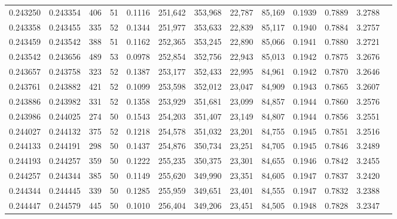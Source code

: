 \begin{tabular}{rrrrrrrrrrrrr}
0.243250 & 0.243354 &   406 &  51 &                                     0.1116 & 251,642 & 353,968 &  22,787 &  85,169 & 0.1939 & 0.7889 & 3.2788 \\
0.243358 & 0.243455 &   335 &  52 &                                     0.1344 & 251,977 & 353,633 &  22,839 &  85,117 & 0.1940 & 0.7884 & 3.2757 \\
0.243459 & 0.243542 &   388 &  51 &                                     0.1162 & 252,365 & 353,245 &  22,890 &  85,066 & 0.1941 & 0.7880 & 3.2721 \\
0.243542 & 0.243656 &   489 &  53 &                                     0.0978 & 252,854 & 352,756 &  22,943 &  85,013 & 0.1942 & 0.7875 & 3.2676 \\
0.243657 & 0.243758 &   323 &  52 &                                     0.1387 & 253,177 & 352,433 &  22,995 &  84,961 & 0.1942 & 0.7870 & 3.2646 \\
0.243761 & 0.243882 &   421 &  52 &                                     0.1099 & 253,598 & 352,012 &  23,047 &  84,909 & 0.1943 & 0.7865 & 3.2607 \\
0.243886 & 0.243982 &   331 &  52 &                                     0.1358 & 253,929 & 351,681 &  23,099 &  84,857 & 0.1944 & 0.7860 & 3.2576 \\
0.243986 & 0.244025 &   274 &  50 &                                     0.1543 & 254,203 & 351,407 &  23,149 &  84,807 & 0.1944 & 0.7856 & 3.2551 \\
0.244027 & 0.244132 &   375 &  52 &                                     0.1218 & 254,578 & 351,032 &  23,201 &  84,755 & 0.1945 & 0.7851 & 3.2516 \\
0.244133 & 0.244191 &   298 &  50 &                                     0.1437 & 254,876 & 350,734 &  23,251 &  84,705 & 0.1945 & 0.7846 & 3.2489 \\
0.244193 & 0.244257 &   359 &  50 &                                     0.1222 & 255,235 & 350,375 &  23,301 &  84,655 & 0.1946 & 0.7842 & 3.2455 \\
0.244257 & 0.244344 &   385 &  50 &                                     0.1149 & 255,620 & 349,990 &  23,351 &  84,605 & 0.1947 & 0.7837 & 3.2420 \\
0.244344 & 0.244445 &   339 &  50 &                                     0.1285 & 255,959 & 349,651 &  23,401 &  84,555 & 0.1947 & 0.7832 & 3.2388 \\
0.244447 & 0.244579 &   445 &  50 &                                     0.1010 & 256,404 & 349,206 &  23,451 &  84,505 & 0.1948 & 0.7828 & 3.2347 \\

\end{tabular}
